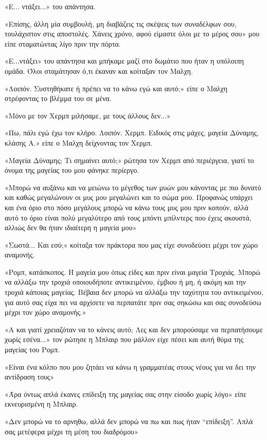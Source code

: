 \documentclass[12pt,twoside, openany]{book}
\begin{document}
«Ε... ντάξει...» του απάντησα.

«Επίσης, άλλη μία συμβουλή, μη διαβάζεις τις σκέψεις των συναδέλφων σου, τουλάχιστον στις αποστολές. Χάνεις χρόνο, αφού είμαστε όλοι με το μέρος σου» μου είπε σταματώντας λίγο πριν την πόρτα.

«Ε...ντάξει» του απάντησα και μπήκαμε μαζί στο δωμάτιο που ήταν η υπόλοιπη ομάδα. Όλοι σταμάτησαν ό,τι έκαναν και κοίταξαν τον Μαλχη. 

«Λοιπόν. Συστηθήκατε ή πρέπει να το κάνω εγώ και αυτό;» είπε ο Μαλχη στρέφοντας το βλέμμα του σε μένα.

«Μόνο με τον Χερμπ μιλήσαμε, με τους άλλους δεν...»

«Πω, πάλι εγώ έχω τον κλήρο. Λοιπόν. Χερμπ. Ειδικός στις μάχες, μαγεία Δύναμης, κλάσης Α.» είπε ο Μαλχη δείχνοντας τον Χερμπ.

«Μαγεία Δύναμης; Τι σημαίνει αυτό;» ρώτησα τον Χερμπ από περιέργεια, γιατί το όνομα της μαγείας του μου φάνηκε περίεργο.

«Μπορώ να αυξάνω και να μειώνω το μέγεθος των μυών μου κάνοντας με πιο δυνατό και καθώς μεγαλώνουν οι μυς μου μεγαλώνει και το σώμα μου. Προφανώς υπάρχει και ένα όριο στο πόσο μεγάλους μπορώ να κάνω τους μυς μου πριν κοπούν, αλλά αυτό το όριο είναι πολύ μεγαλύτερο από τους μπόντι μπίλντερς που έχεις ακουστά, αλλιώς δεν θα ήταν ιδιαίτερη η μαγεία μου»

«Σωστά... Και εσύ;» κοίταξα τον πράκτορα που μας είχε συνοδεύσει μέχρι τον χώρο αναμονής.

«Ρομπ, κατάσκοπος. Η μαγεία μου όπως είδες και πριν είναι μαγεία Τροχιάς. Μπορώ να αλλάξω την τροχιά οποιουδήποτε αντικειμένου, έμβιου ή μη, ή ακόμη και την τροχιά κάποιας μαγείας. Βέβαια δεν μπορώ να αλλάξω την ταχύτητα του αντικειμένου, για αυτό σας είχα πει να αρχίσετε να περπατάτε πριν σας σηκώσω και σας συνοδεύσω μέχρι τον χώρο αναμονής.»

«Α και γιατί χρειαζόταν να το κάνεις αυτό; Λες και  δεν μπορούσαμε να περπατήσουμε χωρίς εσένα...» τον ρώτησε η Μπλαιρ που μάλλον είχε πέσει και αυτή θύμα της μαγείας του Ρομπ.

«Είναι ένα κόλπο που μου ζητάει να κάνω η γραμματέας στους νέους για να δει την αντίδραση τους»

«Άρα όντως απλά έκανες επίδειξη της μαγείας σας στην είσοδο χωρίς λόγο» είπε εκνευρισμένη η Μπλαιρ.

«Δεν μπορώ να το αρνηθω, αλλά δεν μπορώ να πω και πως ήταν “επίδειξη”. Απλά σας μετέφερα μέχρι τη μέση του διαδρόμου»
\end{document}
